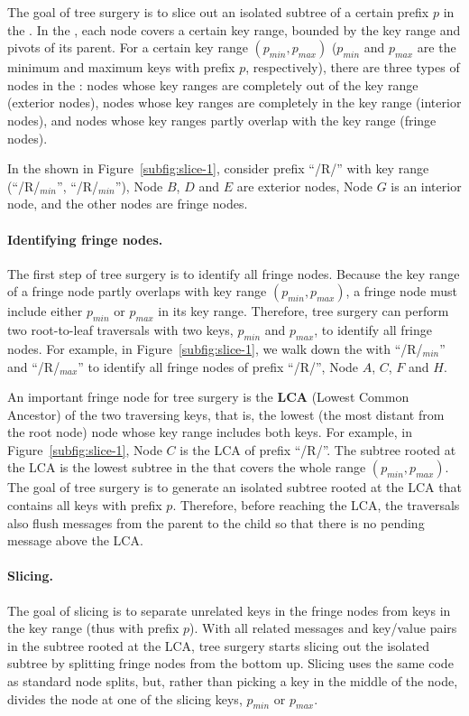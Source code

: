 The goal of tree surgery is to slice out an isolated subtree of a certain
prefix $p$ in the \bet.
In the \bet, each node covers a certain key range, bounded by the key range and
pivots of its parent.
For a certain key range $(p_{min}, p_{max})$ ($p_{min}$ and $p_{max}$ are the
minimum and maximum keys with prefix $p$, respectively), there are three types
of nodes in the \bet:
nodes whose key ranges are completely out of the key range (exterior nodes),
nodes whose key ranges are completely in the key range (interior nodes),
and nodes whose key ranges partly overlap with the key range (fringe nodes).

In the \bet shown in Figure~\ref{subfig:slice-1},
consider prefix ``/R/'' with key range (``/R/$_{min}$'', ``/R/$_{min}$''),
Node $B$, $D$ and $E$ are exterior nodes, Node $G$ is an interior node,
and the other nodes are fringe nodes.

\paragraph{Identifying fringe nodes.}
The first step of tree surgery is to identify all fringe nodes.
Because the key range of a fringe node partly overlaps with key range
$(p_{min}, p_{max})$,
a fringe node must include either $p_{min}$ or $p_{max}$ in its key range.
Therefore, tree surgery can perform two root-to-leaf traversals with two keys,
$p_{min}$ and $p_{max}$, to identify all fringe nodes.
For example, in Figure~\ref{subfig:slice-1}, we walk down the \bet with
``/R/$_{min}$'' and ``/R/$_{max}$'' to identify all fringe nodes of
prefix ``/R/'',
Node $A$, $C$, $F$ and $H$.

An important fringe node for tree surgery is the \textbf{LCA}
(Lowest Common Ancestor) of the two traversing keys, that is, the lowest
(the most distant from the root node)
\bet node whose key range includes both keys.
For example, in Figure~\ref{subfig:slice-1}, Node $C$ is the LCA of prefix
``/R/''.
The subtree rooted at the LCA is the lowest subtree in the \bet that covers
the whole range $(p_{min}, p_{max})$.
The goal of tree surgery is to generate an isolated subtree rooted at the LCA
that contains all keys with prefix $p$.
Therefore, before reaching the LCA, the traversals also flush messages from
the parent to the child so that there is no pending message above the LCA.

\paragraph{Slicing.}
The goal of slicing is to separate unrelated keys in the fringe nodes
from keys in the key range (thus with prefix $p$).
With all related messages and key/value pairs in the subtree rooted at the LCA,
tree surgery starts slicing out the isolated subtree
by splitting fringe nodes from the bottom up.
Slicing uses the same code as standard \bet node splits, but,
rather than picking a key in the middle of the node,
divides the node at one of the slicing keys, $p_{min}$ or $p_{max}$.


